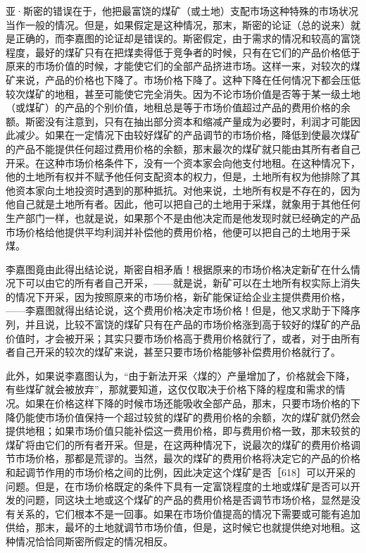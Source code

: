 亚·斯密的错误在于，他把最富饶的煤矿（或土地）支配市场这种特殊的市场状况当作一般的情况。但是，如果假定是这种情况，那末，斯密的论证（总的说来）就是正确的，而李嘉图的论证却是错误的。斯密假定，由于需求的情况和较高的富饶程度，最好的煤矿只有在把煤卖得低于竞争者的时候，只有在它们的产品价格低于原来的市场价值的时候，才能使它们的全部产品挤进市场。这样一来，对较次的煤矿来说，产品的价格也下降了。市场价格下降了。这种下降在任何情况下都会压低较次煤矿的地租，甚至可能使它完全消失。因为不论市场价值是否等于某一级土地（或煤矿）的产品的个别价值，地租总是等于市场价值超过产品的费用价格的余额。斯密没有注意到，只有在抽出部分资本和缩减产量成为必要时，利润才可能因此减少。如果在一定情况下由较好煤矿的产品调节的市场价格，降低到使最次煤矿的产品不能提供任何超过费用价格的余额，那末最次的煤矿就只能由其所有者自己开采。在这种市场价格条件下，没有一个资本家会向他支付地租。在这种情况下，他的土地所有权并不赋予他任何支配资本的权力，但是，土地所有权为他排除了其他资本家向土地投资时遇到的那种抵抗。对他来说，土地所有权是不存在的，因为他自己就是土地所有者。因此，他可以把自己的土地用于采煤，就象用于其他任何生产部门一样，也就是说，如果那个不是由他决定而是他发现时就已经确定的产品市场价格给他提供平均利润并补偿他的费用价格，他便可以把自己的土地用于采煤。

李嘉图竟由此得出结论说，斯密自相矛盾！根据原来的市场价格决定新矿在什么情况下可以由它的所有者自己开采，——就是说，新矿可以在土地所有权实际上消失的情况下开采，因为按照原来的市场价格，新矿能保证给企业主提供费用价格，——李嘉图就得出结论说，这个费用价格决定市场价格！但是，他又求助于下降序列，并且说，比较不富饶的煤矿只有在产品的市场价格涨到高于较好的煤矿的产品价值时，才会被开采；其实只要市场价格高于费用价格就行了，或者，对于由所有者自己开采的较次的煤矿来说，甚至只要市场价格能够补偿费用价格就行了。

此外，如果说李嘉图认为，“由于新法开采〈煤的〉产量增加了，价格就会下降，有些煤矿就会被放弃”，那就要知道，这仅仅取决于价格下降的程度和需求的情况。如果在价格这样下降的时候市场还能吸收全部产品，那末，只要市场价格的下降仍能使市场价值保持一个超过较贫的煤矿的费用价格的余额，次的煤矿就仍然会提供地租；如果市场价值只能补偿这一费用价格，即与费用价格一致，那末较贫的煤矿将由它们的所有者开采。但是，在这两种情况下，说最次的煤矿的费用价格调节市场价格，那都是荒谬的。当然，最次的煤矿的费用价格将决定它的产品的价格和起调节作用的市场价格之间的比例，因此决定这个煤矿是否［618］可以开采的问题。但是，在市场价格既定的条件下具有一定富饶程度的土地或煤矿是否可以开发的问题，同这块土地或这个煤矿的产品的费用价格是否调节市场价格，显然是没有关系的，它们根本不是一回事。如果在市场价值提高的情况下需要或可能有追加供给，那末，最坏的土地就调节市场价值，但是，这时候它也就提供绝对地租。这种情况恰恰同斯密所假定的情况相反。

